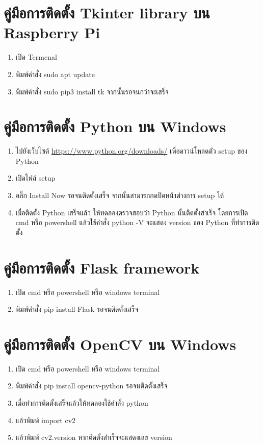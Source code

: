 \section{คู่มือการติดตั้ง Tkinter library บน Raspberry Pi}
\begin{enumerate}
  \item เปิด Termenal
  \item พิมพ์คำสั่ง sudo apt update
  \item พิมพ์คำสั่ง sudo pip3 install tk จากนั้นรอจนกว่าจะเสร็จ
\end{enumerate}

\section{คู่มือการติดตั้ง Python บน Windows}
\begin{enumerate}
  \item ไปยังเว็บไซต์ \url{https://www.python.org/downloads/} เพื่อดาวน์โหลดตัว setup ของ Python
  \item เปิดไฟล์ setup
  \item คลิ๊ก Install Now รอจนติดตั้งเสร็จ จากนั้นสามารถกดปิดหน้าต่างการ setup ได้
  \item เมื่อติดตั้ง Python เสร็จแล้ว ให้ทดลองตรวจสอบว่า Python นั้นติดตั้งสําเร็จ โดยการเปิด cmd
  หรือ powershell แล้วใช้คําสั่ง python -V จะแสดง version ของ Python ที่ทําการติดตั้ง
\end{enumerate}

\section{คู่มือการติดตั้ง Flask framework}
\begin{enumerate}
  \item เปิด cmd หรือ powershell หรือ windows terminal
  \item พิมพ์คำสั่ง pip install Flask รอจนติดตั้งเสร็จ
\end{enumerate}

\section{คู่มือการติดตั้ง OpenCV บน Windows}
\begin{enumerate}
  \item เปิด cmd หรือ powershell หรือ windows terminal
  \item พิมพ์คำสั่ง pip install opencv-python รอจนติดตั้งเสร็จ
  \item เมื่อทำการติดตั้งเสร็จแล้วให้ทดลองใช้คำสั่ง python
  \item แล้วพิมพ์ import cv2
  \item แล้วพิมพ์ cv2.\textunderscore\textunderscore version \textunderscore\textunderscore หากติดตั้งสำเร็จจะแสดงเลข version
\end{enumerate}


